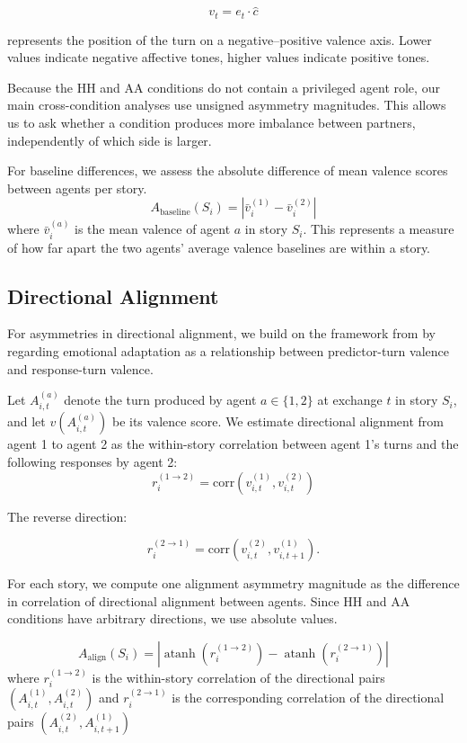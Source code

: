 \documentclass[11pt]{article}
\begin{document}
\[
v_t = e_t \cdot \hat{c}
\]

represents the position of the turn on a negative--positive valence axis. Lower values indicate negative affective tones, higher values indicate positive tones. 

Because the HH and AA conditions do not contain a privileged agent role, our main cross-condition analyses use unsigned asymmetry magnitudes. This allows us to ask whether a condition produces more imbalance between partners, independently of which side is larger. 

For baseline differences, we assess the absolute difference of mean valence scores between agents per story. 
\begin{equation}
    A_{\mathrm{baseline}}(S_i)
    =
    \left|
    \bar{v}^{(1)}_i
    -
    \bar{v}^{(2)}_i
    \right|
\end{equation}
where $\bar{v}^{(a)}_i$ is the mean valence of agent $a$ in story $S_i$. This represents a measure of how far apart the two agents’ average valence baselines are within a story.

\subsection{Directional Alignment}
For asymmetries in directional alignment, we build on the framework from \cite{fundal2026directionalalignmentnarrativeagency} by regarding emotional adaptation as a relationship between predictor-turn valence and response-turn valence. 

Let \(A^{(a)}_{i,t}\) denote the turn produced by agent \(a \in \{1,2\}\) at exchange \(t\) in story \(S_i\), and let \(v(A^{(a)}_{i,t})\) be its valence score. We estimate directional alignment from agent 1 to agent 2 as the within-story correlation between agent 1's turns and the following responses by agent 2:
\[
r_i^{(1 \rightarrow 2)}
=
\mathrm{corr}\left(v^{(1)}_{i,t}, v^{(2)}_{i,t}\right)
\]

The reverse direction:

\[
r_i^{(2 \rightarrow 1)}
=
\mathrm{corr}\left(v^{(2)}_{i,t}, v^{(1)}_{i,t+1}\right).
\]


For each story, we compute one alignment asymmetry magnitude as the difference in correlation of directional alignment between agents. Since HH and AA conditions have arbitrary directions, we use absolute values.

\begin{equation}
    A_{\mathrm{align}}(S_i)
    =
    \left|
    \operatorname{atanh}\!\left(r_i^{(1 \rightarrow 2)}\right)
    -
    \operatorname{atanh}\!\left(r_i^{(2 \rightarrow 1)}\right)
    \right|
\end{equation}
where $r_i^{(1 \rightarrow 2)}$ is the within-story correlation of the directional pairs $(A^{(1)}_{i,t}, A^{(2)}_{i,t})$ and  $r_i^{(2 \rightarrow 1)}$ is the corresponding correlation of the directional pairs $(A^{(2)}_{i,t}, A^{(1)}_{i,t+1})$
\end{document}
